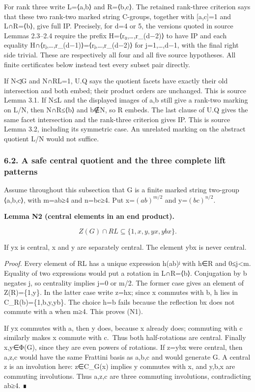 \documentclass[
  11pt,
  a4paper,
]{article}
\begin{document}
For rank three write L=⟨a,b⟩ and R=⟨b,c⟩. The retained rank-three
criterion says that these two rank-two marked string C-groups, together
with {[}a,c{]}=1 and L∩R=⟨b⟩, give full IP. Precisely, for d=4 or 5, the
versions quoted in source Lemmas 2.3--2.4 require the prefix
H=⟨r₀,\ldots,r\_(d−2)⟩ to have IP and each equality
H∩⟨rⱼ,\ldots,r\_(d−1)⟩=⟨rⱼ,\ldots,r\_(d−2)⟩ for j=1,\ldots,d−1, with the
final right side trivial. These are respectively all four and all five
source hypotheses. All finite certificates below instead test every
subset pair directly.

If N◁G and N∩RL=1, U.Q says the quotient facets have exactly their old
intersection and both embed; their product orders are unchanged. This is
source Lemma 3.1. If N≤L and the displayed images of a,b still give a
rank-two marking on L/N, then N∩R≤⟨b⟩ and b∉N, so R embeds. The last
clause of U.Q gives the same facet intersection and the rank-three
criterion gives IP. This is source Lemma 3.2, including its symmetric
case. An unrelated marking on the abstract quotient L/N would not
suffice.

\subsubsection{6.2. A safe central quotient and the three complete lift
patterns}\label{a-safe-central-quotient-and-the-three-complete-lift-patterns}

Assume throughout this subsection that G is a finite marked string
two-group ⟨a,b,c⟩, with m=\textbar ab\textbar≥4 and
n=\textbar bc\textbar≥4. Put x=\((ab)^{m/2}\) and y=\((bc)^{n/2}\).

\textbf{Lemma N2 (central elements in an end product).}

\[
Z(G)\cap RL\subseteq\{1,x,y,yx,ybx\}.
\tag{N1}
\]

If yx is central, x and y are separately central. The element ybx is
never central.

\emph{Proof.} Every element of RL has a unique expression h(ab)ʲ with
h∈R and 0≤j\textless m. Equality of two expressions would put a rotation
in L∩R=⟨b⟩. Conjugation by b negates j, so centrality implies j=0 or
m/2. The former case gives an element of Z(R)=\{1,y\}. In the latter
case write z=hx; since x commutes with b, h lies in
C\_R(b)=\{1,b,y,yb\}. The choice h=b fails because the reflection bx
does not commute with a when m≥4. This proves (N1).

If yx commutes with a, then y does, because x already does; commuting
with c similarly makes x commute with c.~Thus both half-rotations are
central. Finally x,y∈Φ(G), since they are even powers of rotations. If
z=ybx were central, then a,z,c would have the same Frattini basis as
a,b,c and would generate G. A central z is an involution here: z∈C\_G(x)
implies y commutes with x, and y,b,x are commuting involutions. Thus
a,z,c are three commuting involutions, contradicting
\textbar ab\textbar≥4. ∎
\end{document}
